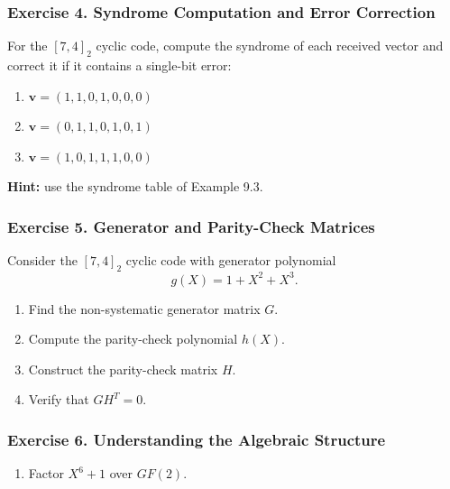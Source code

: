 \documentclass[11pt,oneside]{book}
\providecommand{\tightlist}{\setlength{\itemsep}{0pt}\setlength{\parskip}{0pt}}
\theoremstyle{plain}
\theoremstyle{definition}
\theoremstyle{remark}
\begin{document}
\subsubsection{Exercise 4. Syndrome Computation and Error
Correction}\label{exercise-4.-syndrome-computation-and-error-correction}

For the \([7,4]_2\) cyclic code, compute the syndrome of each received
vector and correct it if it contains a single-bit error:

\begin{enumerate}
\def\labelenumi{(\alph{enumi})}
\item
  \(\mathbf{v}=(1,1,0,1,0,0,0)\)
\item
  \(\mathbf{v}=(0,1,1,0,1,0,1)\)
\item
  \(\mathbf{v}=(1,0,1,1,1,0,0)\)
\end{enumerate}

\textbf{Hint:} use the syndrome table of Example 9.3.


\subsubsection{Exercise 5. Generator and Parity-Check
Matrices}\label{exercise-5.-generator-and-parity-check-matrices}

Consider the \([7,4]_2\) cyclic code with generator polynomial
\[g(X)=1+X^2+X^3.\]

\begin{enumerate}
\def\labelenumi{(\alph{enumi})}
\item
  Find the non-systematic generator matrix \(G\).
\item
  Compute the parity-check polynomial \(h(X)\).
\item
  Construct the parity-check matrix \(H\).
\item
  Verify that \(GH^T=0\).
\end{enumerate}


\subsubsection{Exercise 6. Understanding the Algebraic
Structure}\label{exercise-6.-understanding-the-algebraic-structure}

\begin{enumerate}
\def\labelenumi{(\alph{enumi})}
\tightlist
\item
  Factor \(X^6+1\) over \(GF(2)\).
\end{enumerate}
\end{document}

